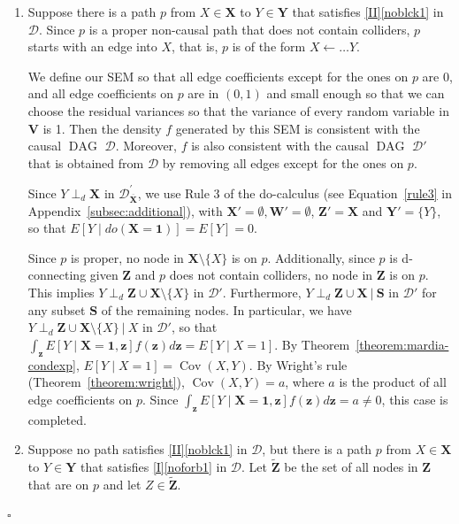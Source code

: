 \documentclass[11pt,a4paper]{article}
\newcommand\given[1][]{\:#1\vert\:}
\newcommand{\dsepp}{\perp_{d}}
\newenvironment{proofof}[1][]{\begin{trivlist}
   \item[\hskip \labelsep {\bfseries Proof of #1.}]}{\hfill{}$\square$\end{trivlist}}
\DeclareMathOperator{\Cov}{Cov}
\DeclareMathOperator{\DAG}{DAG}
\newcommand{\g}[1][G]{\mathcal{#1}}
\begin{document}
\begin{proofof}[Theorem~\ref{theorem:completeness ac}]
\begin{enumerate}[label=(\roman*)]

\item\label{case2} Suppose there is a path $p$ from $X \in \mathbf{X}$ to $Y \in \mathbf{Y}$ that satisfies \ref{II}\ref{noblck1} in $\g[D]$. Since $p$ is a proper non-causal path that does not contain colliders, $p$ starts with an edge into $X$, that is, $p$ is of the form $ X \leftarrow \dots  Y$. 

We define our SEM so that all edge coefficients  except for the ones on $p$ are $0$, and all edge coefficients  on $p$ are in $(0,1)$ and small enough so that we can choose the residual variances so that the variance of every random variable in $\mathbf{V}$ is 1. Then the density $f$ generated by this SEM is consistent with the causal $\DAG$ $\g[D]$. Moreover, $f$ is also consistent with the causal $\DAG$ $\g[D']$ that is obtained from $\g[D]$ by removing all edges except for the ones on $p$.  

Since $Y \dsepp \mathbf{X}$ in $\g[D]^{'}_{\overline{\mathbf{X}}}$, we use Rule 3 of the do-calculus (see Equation~\ref{rule3} in Appendix~\ref{subsec:additional}), with $\mathbf{X'} = \emptyset, \mathbf{W'} = \emptyset$, $\mathbf{Z'} = \mathbf{X}$ and $\mathbf{Y'} = \{Y\}$, so that $E[ Y \mid do(\mathbf{X}=\mathbf{1})]= E[Y]= 0$. 

Since $p$ is proper, no node in $\mathbf{X} \setminus \{X\}$ is on $p$. Additionally, since $p$ is d-connecting given $\mathbf{Z}$ and $p$ does not contain colliders, no node in $\mathbf{Z}$ is on $p$. This implies $Y \dsepp \mathbf{Z} \cup \mathbf{X} \setminus \{X\} $ in $\g[D']$. Furthermore, $Y \dsepp \mathbf{Z} \cup \mathbf{X}\given \mathbf{S}$ in $\g[D']$ for any subset $\mathbf{S}$ of the remaining nodes. In particular, we have $Y \dsepp \mathbf{Z} \cup \mathbf{X} \setminus \{X\} \given X$ in $\g[D']$, so that $\int_\mathbf{z} E[ Y \mid \mathbf{X}=\mathbf{1},\mathbf{z}]f(\mathbf{z})d\mathbf{z} = E[ Y \mid X=1]$. By Theorem~\ref{theorem:mardia-condexp}, $ E[ Y \mid X=1]= \Cov(X,Y)$. By Wright's rule (Theorem~\ref{theorem:wright}), $\Cov(X,Y) = a$, where $a$ is the product of all edge coefficients  on $p$. Since $\int_\mathbf{z} E[ Y \mid \mathbf{X}=\mathbf{1},\mathbf{z}]f(\mathbf{z})d\mathbf{z} = a \neq 0$, this case is completed.

\item\label{case1} Suppose no path satisfies \ref{II}\ref{noblck1} in $\g[D]$, but there is a path $p$ from $X \in \mathbf{X}$ to $Y \in \mathbf{Y}$ that satisfies \ref{I}\ref{noforb1} in $\g[D]$.
Let $\mathbf{\tilde{Z}}$ be the set of all nodes in $\mathbf{Z}$ that are on $p$ and let $Z \in \mathbf{\tilde{Z}}$. 


\end{enumerate}
\end{proofof}
\end{document}
